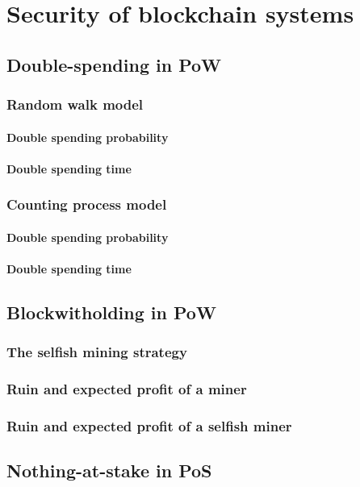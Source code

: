 \chapter{Security of blockchain systems}\label{chap:security}

\section{Double-spending in PoW}\label{sec:double_spending}
\subsection{Random walk model}\label{ssec:double_spending_rw}
\subsubsection{Double spending probability}\label{sssec:double_spending_rw_dsp}

\subsubsection{Double spending time}\label{sssec:double_spending_rw_dst}
\subsection{Counting process model}\label{sec:counting_process}
\subsubsection{Double spending probability}\label{sssec:double_spending_counting_process_dsp}

\subsubsection{Double spending time}\label{sssec:double_spending_counting_process_dst}

\section{Blockwitholding in PoW}\label{sec:blockwithholding}
\subsection{The selfish mining strategy}\label{ssec:selfish_mining}
\subsection{Ruin and expected profit of a miner}\label{ssec:selfish_mining}
\subsection{Ruin and expected profit of a selfish miner}\label{ssec:selfish_mining}

\section{Nothing-at-stake in PoS}\label{sec:NaS}
\newpage